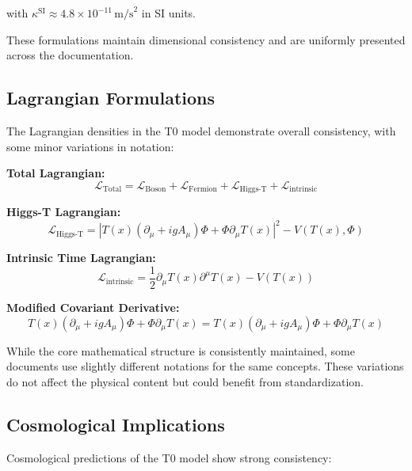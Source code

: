 \documentclass[a4paper,11pt]{article}
\newcommand{\Tfield}{T(x)}
\newcommand{\DhiggsT}{\Tfield (\partial_\mu + ig A_\mu) \Phi + \Phi \partial_\mu \Tfield}
\begin{document}
	with $\kappa^{\text{SI}} \approx 4.8 \times 10^{-11} \, \text{m/s}^2$ in SI units.
	
	These formulations maintain dimensional consistency and are uniformly presented across the documentation.
	
	\subsection{Lagrangian Formulations}
	
	The Lagrangian densities in the T0 model demonstrate overall consistency, with some minor variations in notation:
	
	\begin{tcolorbox}[colback=blue!5!white, colframe=blue!75!black, title=Lagrangian Formulations]
		\textbf{Total Lagrangian:}
		\begin{equation}
			\mathcal{L}_{\text{Total}} = \mathcal{L}_{\text{Boson}} + \mathcal{L}_{\text{Fermion}} + \mathcal{L}_{\text{Higgs-T}} + \mathcal{L}_{\text{intrinsic}}
		\end{equation}
		
		\textbf{Higgs-T Lagrangian:}
		\begin{equation}
			\mathcal{L}_{\text{Higgs-T}} = |\DhiggsT|^2 - V(\Tfield, \Phi)
		\end{equation}
		
		\textbf{Intrinsic Time Lagrangian:}
		\begin{equation}
			\mathcal{L}_{\text{intrinsic}} = \frac{1}{2} \partial_\mu \Tfield \partial^\mu \Tfield - V(\Tfield)
		\end{equation}
		
		\textbf{Modified Covariant Derivative:}
		\begin{equation}
			\DhiggsT = \Tfield (\partial_\mu + ig A_\mu) \Phi + \Phi \partial_\mu \Tfield
		\end{equation}
	\end{tcolorbox}
	
	While the core mathematical structure is consistently maintained, some documents use slightly different notations for the same concepts. These variations do not affect the physical content but could benefit from standardization.
	
	\subsection{Cosmological Implications}
	
	Cosmological predictions of the T0 model show strong consistency:
	
\end{document}
